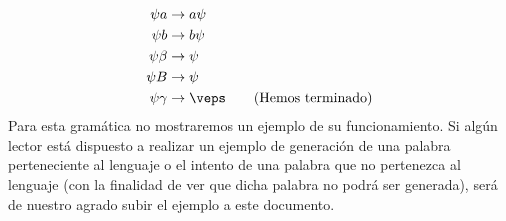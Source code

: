 \begin{ejercicio}
\begin{enumerate}
            \begin{align*}
                \psi a &\rightarrow a \psi \\
                \psi b &\rightarrow b \psi \\
                \psi \beta &\rightarrow  \psi \\
                \psi B &\rightarrow  \psi \\
                \psi \gamma &\rightarrow  \veps \qquad \text{(Hemos terminado)}
            \end{align*}
    Para esta gramática no mostraremos un ejemplo de su funcionamiento. Si algún lector está dispuesto a realizar un ejemplo de generación de una palabra perteneciente al lenguaje o el intento de una palabra que no pertenezca al lenguaje (con la finalidad de ver que dicha palabra no podrá ser generada), será de nuestro agrado subir el ejemplo a este documento.
    \end{enumerate}
\end{ejercicio}

